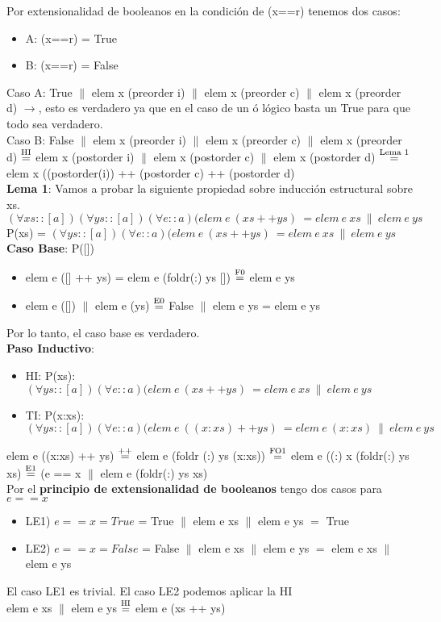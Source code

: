 \documentclass{article}
\begin{document}
Por extensionalidad de booleanos en la condición de (x==r) tenemos dos casos:
\begin{itemize}
\item A: (x==r) = True 
\item B: (x==r) = False
\end{itemize}
Caso A: True $\|$ elem x (preorder i) $\|$ elem x (preorder c) $\|$ elem x (preorder d) $\rightarrow$, esto es verdadero ya que en el caso de un ó lógico basta un True para que todo sea verdadero.  \\     
Caso B: False $\|$ elem x (preorder i) $\|$ elem x (preorder c) $\|$ elem x (preorder d) $\stackrel{\text{HI}}{=}$ elem x (postorder i) $\|$ elem x (postorder c)  $\|$ elem x (postorder d) $\stackrel{\text{Lema 1}}{=}$ elem x ((postorder(i)) ++ (postorder c) ++ (postorder d) \\

\textbf{Lema 1}: Vamos a probar la siguiente propiedad sobre inducción estructural sobre xs. \\
$(\forall xs :: [a])(\forall ys :: [a])(\forall e::a)(elem \ e \ (xs++ys) \ = elem \ e \ xs \ \| \ elem \ e \ ys$ \\
P(xs) = $(\forall ys :: [a])(\forall e::a)(elem \ e \ (xs++ys) \ = elem \ e \ xs \ \| \ elem \ e \ ys$ \\
\textbf{Caso Base}: P([])
\begin{itemize}
    \item elem e ([] ++ ys) = elem e (foldr(:) ys []) $\stackrel{\text{F0}}{=}$ elem e ys
    \item elem e ([]) $\|$ elem e (ys) $\stackrel{\text{E0}}{=}$ False $\|$ elem e ys = elem e ys
\end{itemize}
Por lo tanto, el caso base es verdadero. \\
\textbf{Paso Inductivo}: 
\begin{itemize}
    \item HI: P(xs): $(\forall ys :: [a])(\forall e::a)(elem \ e \ (xs++ys) \ = elem \ e \ xs \ \| \ elem \ e \ ys$
    \item TI: P(x:xs): $(\forall ys :: [a])(\forall e::a)(elem \ e \ ((x:xs)++ys) \ = elem \ e \ (x:xs) \ \| \ elem \ e \ ys$
\end{itemize}
elem e ((x:xs) ++ ys) $\stackrel{\text{++}}{=}$ elem e (foldr (:) ys (x:xs)) $\stackrel{\text{FO1}}{=}$ elem e ((:) x (foldr(:) ys xs) $\stackrel{\text{E1}}{=}$ (e == x $\|$ elem e (foldr(:) ys xs) \\
Por el \textbf{principio de extensionalidad de booleanos} tengo dos casos para $e==x$
\begin{itemize}
    \item LE1) $e==x = True$ = True $\|$ elem e xs $\|$ elem e ys $=$ True
    \item LE2) $e==x = False$ = False $\|$ elem e xs $\|$ elem e ys $=$ elem e xs $\|$ elem e ys 
\end{itemize}
El caso LE1 es trivial. El caso LE2 podemos aplicar la HI \\
elem e xs $\|$ elem e ys $\stackrel{\text{HI}}{=}$ elem e (xs ++ ys)
\end{document}

